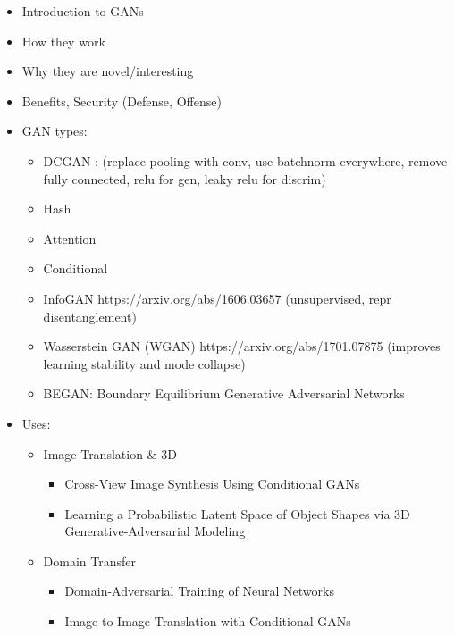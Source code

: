 \documentclass[11pt]{article}
\begin{document}
\begin{itemize}
    \item Introduction to GANs \cite{NIPS2014_5423} \\ %
    \item How they work\\
    \item Why they are novel/interesting\\
    \item Benefits, Security (Defense, Offense)\\

    \item GAN types: %
    \begin{itemize}
        \item DCGAN \cite{DBLP:journals/corr/RadfordMC15}: (replace pooling with conv, use batchnorm everywhere, remove fully connected, relu for gen, leaky relu for discrim) %
        \item Hash
        \item Attention
        \item Conditional \cite{mirza2014conditional}\\
        \item InfoGAN https://arxiv.org/abs/1606.03657 (unsupervised, repr disentanglement)
        \item Wasserstein GAN (WGAN) https://arxiv.org/abs/1701.07875 (improves learning stability and mode collapse)
        \item BEGAN: Boundary Equilibrium Generative Adversarial Networks
    \end{itemize}

    \item Uses: 
    \begin{itemize}
        \item Image Translation \& 3D
        \begin{itemize}
            \item Cross-View Image Synthesis Using Conditional GANs \cite{regmi2018crossview}
            \item Learning a Probabilistic Latent Space of Object Shapes via 3D Generative-Adversarial Modeling \cite{NIPS2016_6096}
        \end{itemize}
        
        \item Domain Transfer
        \begin{itemize}
            \item Domain-Adversarial Training of Neural Networks \cite{ganin2016domain}
            \item Image-to-Image Translation with Conditional GANs \cite{isola2017image}
        \end{itemize}
        

\end{itemize}
\end{itemize}
\end{document}
